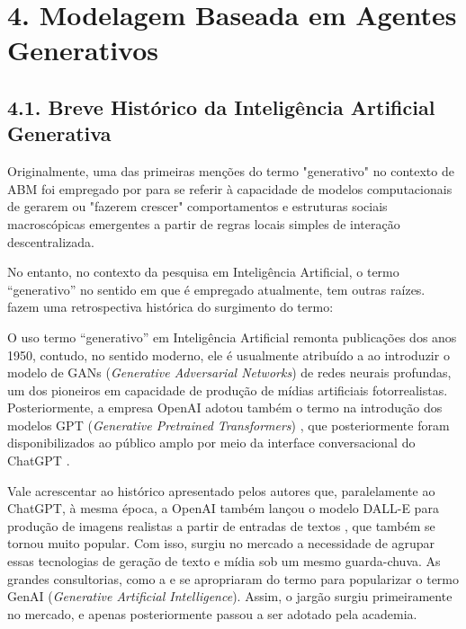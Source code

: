 \documentclass[12pt,oneside,a4paper,brazil,sumario=tradicional]{abntex2}
\begin{document}
\section*{4. Modelagem Baseada em Agentes Generativos}
\subsection*{4.1. Breve Histórico da Inteligência Artificial Generativa}
Originalmente, uma das primeiras menções do termo "generativo" no contexto de ABM foi empregado por \textcite{epstein1999} para se referir à capacidade de modelos computacionais de gerarem ou "fazerem crescer" comportamentos e estruturas sociais macroscópicas emergentes a partir de regras locais simples de interação descentralizada.

No entanto, no contexto da pesquisa em Inteligência Artificial, o termo “generativo” no sentido em que é empregado atualmente, tem outras raízes. \textcite{he2025} fazem uma retrospectiva histórica do surgimento do termo:

O uso termo “generativo” em Inteligência Artificial remonta publicações dos anos 1950, contudo, no sentido moderno, ele é usualmente atribuído a \textcite{goodfellow2014} ao introduzir o modelo de GANs (\textit{Generative Adversarial Networks}) de redes neurais profundas, um dos pioneiros em capacidade de produção de mídias artificiais fotorrealistas. Posteriormente, a empresa OpenAI adotou também o termo na introdução dos modelos GPT (\textit{Generative Pretrained Transformers}) \parencite{radford2018}, que posteriormente foram disponibilizados ao público amplo por meio da interface conversacional do ChatGPT \parencite{openai2022}.

Vale acrescentar ao histórico apresentado pelos autores que, paralelamente ao ChatGPT, à mesma época, a OpenAI também lançou o modelo DALL-E para produção de imagens realistas a partir de entradas de textos \parencite{ramesh2021}, que também se tornou muito popular. Com isso, surgiu no mercado a necessidade de agrupar essas tecnologias de geração de texto e mídia sob um mesmo guarda-chuva. As grandes consultorias, como a \textcite{mckinseycompany2023} e \textcite{bostonconsultinggroup2024} se apropriaram do termo para popularizar o termo GenAI (\textit{Generative Artificial Intelligence}). Assim, o jargão surgiu primeiramente no mercado, e apenas posteriormente passou a ser adotado pela academia.
\end{document}
